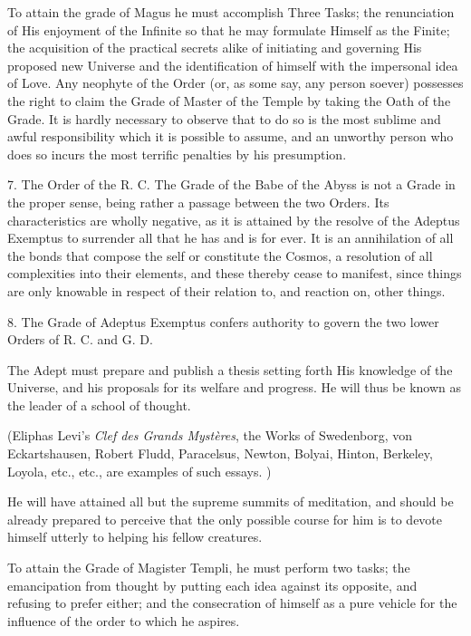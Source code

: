 To attain the grade of Magus he must accomplish Three Tasks; the renunciation of His enjoyment of the Infinite so that he may formulate Himself as the Finite; the acquisition of the practical secrets alike of initiating and governing His proposed new Universe and the identification of himself with the impersonal idea of Love. Any neophyte of the Order (or, as some say, any person soever) possesses the right to claim the Grade of Master of the Temple by taking the Oath of the Grade. It is hardly necessary to observe that to do so is the most sublime and awful responsibility which it is possible to assume, and an unworthy person who does so incurs the most terrific penalties by his presumption.

\vspace{\baselineskip}

7. The Order of the R. C. The Grade of the Babe of the Abyss is not a Grade in the proper sense, being rather a passage between the two Orders. Its characteristics are wholly negative, as it is attained by the resolve of the Adeptus Exemptus to surrender all that he has and is for ever. It is an annihilation of all the bonds that compose the self or constitute the Cosmos, a resolution of all complexities into their elements, and these thereby cease to manifest, since things are only knowable in respect of their relation to, and reaction on, other things.

\vspace{\baselineskip}

8. The Grade of Adeptus Exemptus confers authority to govern the two lower Orders of R. C. and G. D.

The Adept must prepare and publish a thesis setting forth His knowledge of the Universe, and his proposals for its welfare and progress. He will thus be known as the leader of a school of thought.

(Eliphas Levi's \textit{Clef des Grands Myst\`{e}res}, the Works of Swedenborg, von Eckartshausen, Robert Fludd, Paracelsus, Newton, Bolyai, Hinton, Berkeley, Loyola, etc., etc., are examples of such essays. )

He will have attained all but the supreme summits of meditation, and should be already prepared to perceive that the only possible course for him is to devote himself utterly to helping his fellow creatures.

To attain the Grade of Magister Templi, he must perform two tasks; the emancipation from thought by putting each idea against its opposite, and refusing to prefer either; and the consecration of himself as a pure vehicle for the influence of the order to which he aspires.


